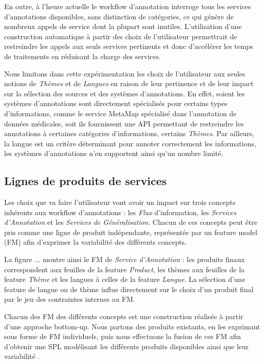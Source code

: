 \documentclass[]{easychair}
\newcommand{\comment}[4]{\par\noindent\hspace*{-0.5cm}{\parbox{\columnwidth}{\textbf{\color{#1}//#2[#3]:#4}}}\par}
\newcommand{\si}[1]{\comment{red}{}{#1}{SI}}
\begin{document}
En outre, à l'heure actuelle le workflow d'annotation interroge tous les services d'annotations disponibles, sans distinction de catégories, ce qui génère de nombreux appels de service dont la plupart sont inutiles. L'utilisation d'une construction automatique à partir des choix de l'utilisateur permettrait de restreindre les appels aux seuls services pertinents et donc d'accélérer les temps de traitements en réduisant la charge des services. 

Nous limitons dans cette expérimentation les choix de l'utilisateur aux seules notions de \textit{Thèmes} et de \textit{Langues} en raison de leur pertinence et de leur impact sur la sélection des sources et des systèmes d'annotations. En effet, soient les systèmes d'annotations sont directement spécialisés pour certains types d'informations, comme le service MetaMap \cite{MetaMap} spécialisé dans l'annotation de données médicales, soit ils fournissent une API permettant de restreindre les annotations à certaines catégories d'informations, certains \textit{Thèmes}. Par ailleurs, la langue est un critère déterminant pour annoter correctement les informations, les systèmes d'annotations n'en supportent ainsi qu'un nombre limité. 

\subsection{Lignes de produits de services}
Les choix que va faire l'utilisateur vont avoir un impact sur trois concepts inhérents aux workflow d'annotations : les \textit{Flux} d'information, les \textit{Services d'Annotation} et les \textit{Services de Généralisation}. Chacun de ces concepts peut être pris comme une ligne de produit indépendante, représentée par un feature model (FM) afin d'exprimer la variabilité des différents concepts.

La figure ... montre ainsi le FM de \textit{Service d'Annotation} : les produits finaux correspondent aux feuilles de la feature \textit{Product}, les thèmes aux feuilles de la feature \textit{Thème} et les langues à celles de la feature \textit{Langue}. La sélection d'une feature de langue ou de thème influe directement sur le choix d'un produit final par le jeu des contraintes internes au FM. 

\si{à voir si on garde en dessous...}
Chacun des FM des différents concepts est une construction réalisée à partir d'une approche bottom-up. Nous partons des produits existants, en les exprimant sous forme de FM individuels, puis nous effectuons la fusion de ces FM afin d'obtenir une SPL modélisant les différents produits disponibles ainsi que leur variabilité \cite{Acher2011}.
\end{document}
